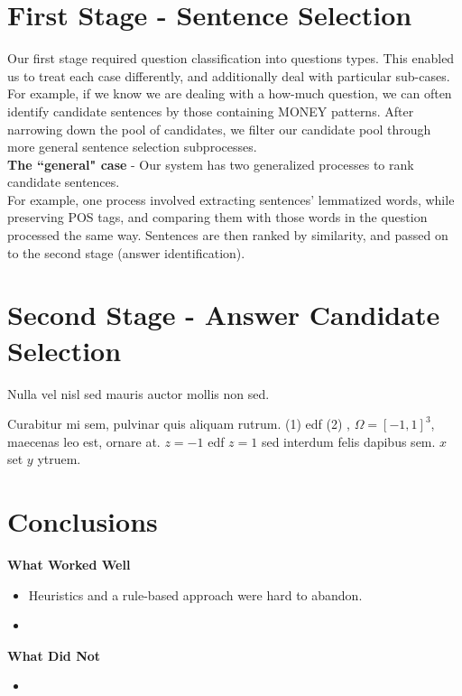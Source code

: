 \documentclass[a1,landscape]{a0poster}
\begin{document}
\begin{multicols}{3}
\section*{\LARGE First Stage - Sentence Selection}
Our first stage required question classification into questions types. This enabled us to treat each case differently, and additionally deal with particular sub-cases. \\
For example, if we know we are dealing with a how-much question, we can often identify candidate sentences by those containing MONEY patterns. After narrowing down the pool of candidates, we filter our candidate pool through more general sentence selection subprocesses. \\
\textbf{The ``general" case} - Our system has two generalized processes to rank candidate sentences.\\ For example, one process involved extracting sentences' lemmatized words, while preserving POS tags, and comparing them with those words in the question processed the same way. Sentences are then ranked by similarity, and passed on to the second stage (answer identification).

\section*{\LARGE Second Stage - Answer Candidate Selection}

Nulla vel nisl sed mauris auctor mollis non sed. 

Curabitur mi sem, pulvinar quis aliquam rutrum. (1) edf (2)
, $\Omega=[-1,1]^3$, maecenas leo est, ornare at. $z=-1$ edf $z=1$ sed interdum felis dapibus sem. $x$ set $y$ ytruem. 


\color{SaddleBrown} %

\section*{\LARGE Conclusions}
\textbf{What Worked Well}
\begin{itemize}
    \item Heuristics and a rule-based approach were hard to abandon.
    \item 
\end{itemize}
\vspace{0.7em}
\textbf{What Did Not}
\begin{itemize}
    \item 
\end{itemize}


\end{multicols}
\end{document}
